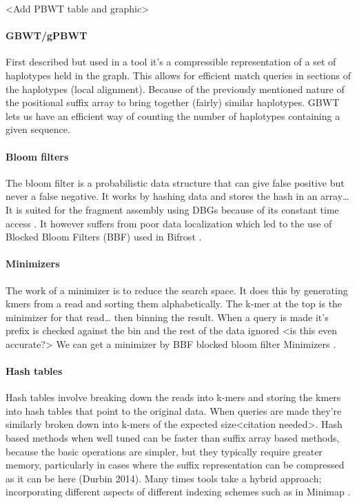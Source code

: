 \documentclass[10pt, a4paper]{article}
\begin{document}
<Add PBWT table and graphic>

\paragraph{GBWT/gPBWT}
\label{sec:org9837bd3}
First described \cite{novakGraphExtensionPositional2017} but used in a tool
\cite{sirenHaplotypeawareGraphIndexes2020} it’s a compressible representation of
a set of haplotypes held in the graph. This allows for efficient match queries
in sections of the haplotypes (local alignment). Because of the previously
mentioned nature of the positional suffix array to bring together (fairly)
similar haplotypes.
GBWT lets us have an efficient way of counting the number of haplotypes
containing a given sequence.

\paragraph{Bloom filters}
\label{sec:org5bc577a}
The bloom filter is a probabilistic data structure that can give false positive
but never a false negative.  It works by hashing data and stores the hash in an
array\ldots{}
It is suited for the fragment assembly using DBGs because of its constant time
access \cite{chikhiSpaceefficientExactBruijn2013}. It however suffers from poor
data localization  which led to the use of Blocked Bloom Filters (BBF)
\cite{putzeCacheHashSpaceefficient2010} used in
Bifrost \cite{holleyBifrostHighlyParallel2019}.

\paragraph{Minimizers}
\label{sec:orgac1eb2c}
The work of a minimizer is to reduce the search space. It does this by generating
kmers from a read and sorting them alphabetically. The k-mer at the top is the
minimizer for that read\ldots{} then binning the result. When a query is made it’s
prefix is checked against the bin and the rest of the data ignored
<is this even accurate?>
We can get a minimizer by BBF blocked bloom filter Minimizers
\cite{grabowskiDiskbasedCompressionData2015,robertsReducingStorageRequirements2004}.

\paragraph{Hash tables}
\label{sec:org9a0307f}
Hash tables involve breaking down the reads into k-mers and storing the kmers
into hash tables that point to the original data. When queries are made they’re
similarly broken down into k-mers of the expected size<citation needed>.
Hash based methods when well tuned can be faster than suffix array based
methods, because the basic operations are simpler, but they typically require
greater memory, particularly in cases where the suffix representation can be
compressed as it can be here (Durbin 2014).
Many times tools take a hybrid approach; incorporating different aspects of
different indexing schemes such as in Minimap
\cite{liDesignConstructionReference2020}. 
\end{document}
